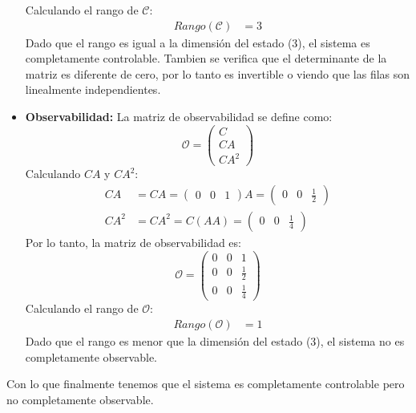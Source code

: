 \documentclass[
  11pt,
  letterpaper,
   addpoints,
   answers
  ]{exam}
\begin{document}
\begin{questions}
\begin{solution}
\begin{itemize}
\begin{equation}
  \end{equation}
  Calculando el rango de $\mathcal{C}$:
  \begin{align}
    Rango(\mathcal{C}) &= 3
  \end{align}
  Dado que el rango es igual a la dimensión del estado (3), el sistema es completamente controlable. Tambien se verifica que el determinante de la matriz es diferente de cero, por lo tanto es invertible o viendo que las filas son linealmente independientes.

  \item \textbf{Observabilidad:} La matriz de observabilidad se define como:
  \begin{equation}
    \mathcal{O} = \begin{pmatrix} C \\ CA \\ CA^2 \end{pmatrix}
  \end{equation}
  Calculando $CA$ y $CA^2$:
  \begin{align}
    CA &= C A = \begin{pmatrix} 0 & 0 & 1 \end{pmatrix} A = \begin{pmatrix} 0 & 0 & \frac{1}{2} \end{pmatrix} \\
    CA^2 &= C A^2 = C (AA) = \begin{pmatrix} 0 & 0 & \frac{1}{4} \end{pmatrix}
  \end{align}
  Por lo tanto, la matriz de observabilidad es:
  \begin{equation}
    \mathcal{O} = \begin{pmatrix} 0 & 0 & 1 \\ 0 & 0 & \frac{1}{2} \\ 0 & 0 & \frac{1}{4} \end{pmatrix}
  \end{equation}
  Calculando el rango de $\mathcal{O}$:
  \begin{align}
    Rango(\mathcal{O}) &= 1
  \end{align}
  Dado que el rango es menor que la dimensión del estado (3), el sistema no es completamente observable.
\end{itemize}
Con lo que finalmente tenemos que el sistema es completamente controlable pero no completamente observable.

\end{solution}
\end{questions}
\end{document}

